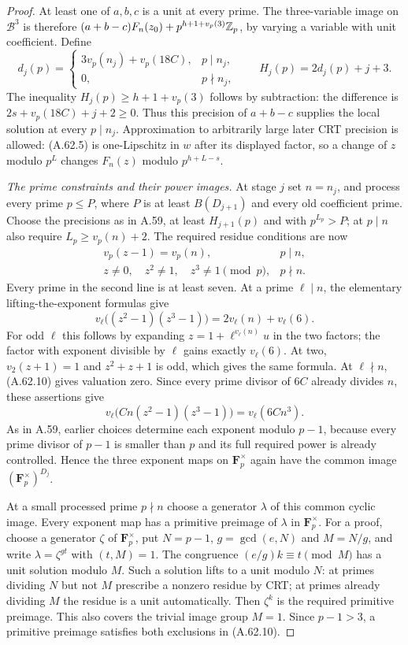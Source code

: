 \begin{proof}
At least one of $a,b,c$ is a unit at every prime.
The three-variable image on $\mathcal B^3$
is therefore
$(a+b-c)F_n(z_0)+p^{h+1+v_p(3)}\mathbb Z_p$,
by varying a variable with unit coefficient.
Define
\[
 d_j(p)=
 \begin{cases}
  3v_p(n_j)+v_p(18C),&p\mid n_j,\\
  0,&p\nmid n_j,
 \end{cases}
 \qquad H_j(p)=2d_j(p)+j+3.
 \tag{A.62.9}
\]
The inequality
$H_j(p)\ge h+1+v_p(3)$ follows by subtraction:
the difference is
$2s+v_p(18C)+j+2\ge0$.
Thus this precision of $a+b-c$ supplies the
local solution at every $p\mid n_j$.
Approximation to arbitrarily large later
CRT precision is allowed: (A.62.5) is
one-Lipschitz in $w$ after its displayed
factor, so a change of $z$ modulo $p^L$
changes $F_n(z)$ modulo $p^{h+L-s}$.

\emph{The prime constraints and their power images.}
At stage $j$ set $n=n_j$, and process every
prime $p\le P$, where $P$ is at least
$B(D_{j+1})$ and every old coefficient prime.
Choose the precisions as in A.59, at least
$H_{j+1}(p)$ and with $p^{L_p}>P$;
at $p\mid n$ also require $L_p\ge v_p(n)+2$.
The required residue conditions are now
\[
 \begin{array}{ll}
 v_p(z-1)=v_p(n),&p\mid n,\\
 z\ne0,\quad z^2\ne1,\quad z^3\ne1\pmod p,
                                             &p\nmid n.
 \end{array}
 \tag{A.62.10}
\]
Every prime in the second line is at least seven.
At a prime $\ell\mid n$, the elementary
lifting-the-exponent formulas give
\[
 v_\ell\bigl((z^2-1)(z^3-1)\bigr)
                     =2v_\ell(n)+v_\ell(6).
 \tag{A.62.11}
\]
For odd $\ell$ this follows by expanding
$z=1+\ell^{v_\ell(n)}u$ in the two factors;
the factor with exponent divisible by
$\ell$ gains exactly $v_\ell(6)$.
At two, $v_2(z+1)=1$ and
$z^2+z+1$ is odd, which gives the same formula.
At $\ell\nmid n$, (A.62.10) gives valuation zero.
Since every prime divisor of $6C$ already
divides $n$, these assertions give
\[
 v_\ell\bigl(Cn(z^2-1)(z^3-1)\bigr)
                         =v_\ell(6Cn^3).
 \tag{A.62.12}
\]
As in A.59, earlier choices determine each
exponent modulo $p-1$, because every prime
divisor of $p-1$ is smaller than $p$ and
its full required power is already controlled.
Hence the three exponent maps on
$\mathbf F_p^\times$ again have the common
image $(\mathbf F_p^\times)^{D_j}$.

At a small processed prime $p\nmid n$ choose
a generator $\lambda$ of this common cyclic
image. Every exponent map has a primitive
preimage of $\lambda$ in $\mathbf F_p^\times$.
For a proof, choose a generator $\zeta$ of
$\mathbf F_p^\times$, put $N=p-1$,
$g=\gcd(e,N)$ and $M=N/g$, and write
$\lambda=\zeta^{gt}$ with $(t,M)=1$.
The congruence
$(e/g)k\equiv t\pmod M$ has a unit solution
modulo $M$. Such a solution lifts to a unit
modulo $N$: at primes dividing $N$ but not
$M$ prescribe a nonzero residue by CRT;
at primes already dividing $M$ the residue
is a unit automatically.
Then $\zeta^k$ is the required primitive
preimage. This also covers the trivial
image group $M=1$.
Since $p-1>3$, a primitive preimage satisfies
both exclusions in (A.62.10).


\end{proof}
